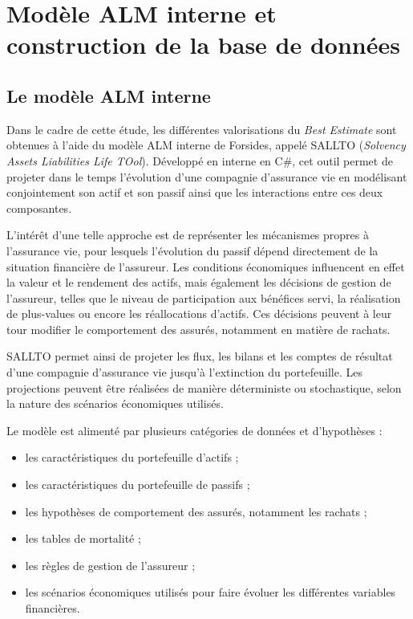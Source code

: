 \chapter{Modèle ALM interne et construction de la base de données}

\section{Le modèle ALM interne}

Dans le cadre de cette étude, les différentes valorisations du \textit{Best Estimate} sont obtenues à l'aide du modèle ALM interne de Forsides, appelé SALLTO (\textit{Solvency Assets Liabilities Life TOol}). Développé en interne en C\#, cet outil permet de projeter dans le temps l'évolution d'une compagnie d'assurance vie en modélisant conjointement son actif et son passif ainsi que les interactions entre ces deux composantes.

L'intérêt d'une telle approche est de représenter les mécanismes propres à l'assurance vie, pour lesquels l'évolution du passif dépend directement de la situation financière de l'assureur. Les conditions économiques influencent en effet la valeur et le rendement des actifs, mais également les décisions de gestion de l'assureur, telles que le niveau de participation aux bénéfices servi, la réalisation de plus-values ou encore les réallocations d'actifs. Ces décisions peuvent à leur tour modifier le comportement des assurés, notamment en matière de rachats.

SALLTO permet ainsi de projeter les flux, les bilans et les comptes de résultat d'une compagnie d'assurance vie jusqu'à l'extinction du portefeuille. Les projections peuvent être réalisées de manière déterministe ou stochastique, selon la nature des scénarios économiques utilisés.

Le modèle est alimenté par plusieurs catégories de données et d'hypothèses :
\begin{itemize}[noitemsep,topsep=2pt]
    \item les caractéristiques du portefeuille d'actifs ;
    \item les caractéristiques du portefeuille de passifs ;
    \item les hypothèses de comportement des assurés, notamment les rachats ;
    \item les tables de mortalité ;
    \item les règles de gestion de l'assureur ;
    \item les scénarios économiques utilisés pour faire évoluer les différentes variables financières.
\end{itemize}

